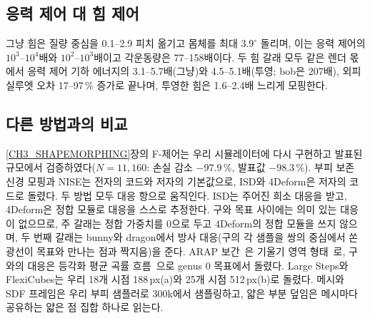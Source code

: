 \subsection{응력 제어 대 힘 제어}
그냥 힘은 질량 중심을 0.1--2.9 피치 옮기고 몸체를 최대 $3.9^\circ$ 돌리며, 이는 응력 제어의 $10^3$--$10^4$배와 $10^2$--$10^3$배이고
각운동량은 77--158배이다. 두 힘 갈래 모두 같은 렌더 몫에서 응력 제어 기하 에너지의 3.1--5.7배(그냥)와 4.5--5.1배(투영; bob은
207배), 외피 실루엣 오차 17--97\,\% 증가로 끝나며, 투영한 힘은 1.6--2.4배 느리게 모핑한다.

\subsection{다른 방법과의 비교}
\label{app:ch4_comparison_ko}
\ref{CH3_SHAPEMORPHING}장의 F-제어는 우리 시뮬레이터에 다시 구현하고 발표된 규모에서 검증하였다($N=11{,}160$: 손실 감소
$-97.9$\,\%, 발표값 $-98.3$\,\%). 부피 보존 신경 모핑과 NISE는 전자의 코드와 저자의 기본값으로, ISD와 4Deform은 저자의 코드로
돌렸다. 두 방법 모두 대응 항으로 움직인다. ISD는 주어진 희소 대응을 받고, 4Deform은 정합 모듈로 대응을 스스로
추정한다. 구와 목표 사이에는 의미 있는 대응이 없으므로, 주 갈래는 정합 가중치를 0으로 두고 4Deform의 정합 모듈을 쓰지
않으며, 두 번째 갈래는 bunny와 dragon에서 방사 대응(구의 각 샘플을 쌍의 중심에서 쏜 광선이 목표와 만나는 점과 짝지음)을
준다. ARAP
보간~\citep{alexa2000arap}은 기울기 영역 형태~\citep{sumner2004deftransfer,xu2005poisson}로, 구와의 대응은 등각화 평균 곡률
흐름~\citep{kazhdan2012cmcf}으로 genus 0 목표에서 돌렸다. Large Steps와 FlexiCubes는 우리 18개 시점 188\,px(a)와 25개 시점
512\,px(b)로 돌렸다. 메시와 SDF 프레임은 우리 부피 샘플러로 300k에서 샘플링하고, 얇은 부분 덮임은 메시마다 공유하는 얇은 점
집합 하나로 읽는다.

